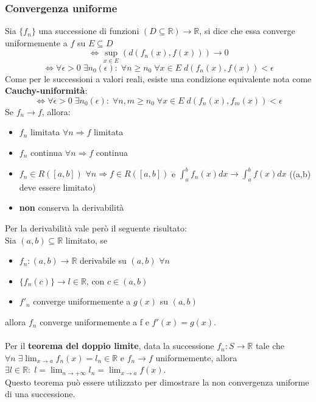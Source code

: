 \documentclass{article}
\newcommand{\R}{\mathds{R}}
\begin{document}
\subsubsection{Convergenza uniforme}
Sia $\{f_n\}$ una successione di funzioni $(D\subseteq\R)\rightarrow\R$, si dice che essa converge uniformemente a $f$ su $E\subseteq D$
$$ \Leftrightarrow \sup_{x\in E}(d(f_n(x),f(x)))\rightarrow0 $$
$$ \Leftrightarrow \forall\epsilon>0\;\exists n_0(\epsilon):\; \forall n\geq n_0\; \forall x\in E\; d(f_n(x),f(x))<\epsilon $$
Come per le successioni a valori reali, esiste una condizione equivalente nota come \textbf{Cauchy-uniformità}:
$$ \Leftrightarrow \forall\epsilon>0\;\exists n_0(\epsilon):\; \forall n,m\geq n_0\; \forall x\in E\; d(f_n(x),f_m(x))<\epsilon $$
Se $f_n\rightarrow f$, allora:
\begin{itemize}
    \item $f_n$ limitata $\forall n\Rightarrow f$ limitata
    \item $f_n$ continua $\forall n\Rightarrow f$ continua
    \item $f_n\in R([a,b])$ $\forall n\Rightarrow f\in R([a,b])$ e $\int_a^b f_n(x)dx\rightarrow\int_a^bf(x)dx$ ((a,b) deve essere limitato)
    \item \textbf{non} conserva la derivabilità 
\end{itemize}
Per la derivabilità vale però il seguente risultato:\\
Sia $(a,b)\subseteq\R$ limitato, se
\begin{itemize}
    \item $f_n:(a,b)\rightarrow\R$ derivabile su $(a,b)$ $\forall n$
    \item $\{f_n(c)\}\rightarrow l\in\R$, con $c\in(a,b)$
    \item $f'_n$ converge uniformemente a $g(x)$ su $(a,b)$
\end{itemize}
allora $f_n$ converge uniformemente a f e $f'(x)=g(x)$.\\\\
Per il \textbf{teorema del doppio limite}, data la successione $f_n:S\rightarrow\R$ tale che $\forall n\;\exists\lim_{x\rightarrow a}f_n(x)=l_n\in\R$ e $f_n\rightarrow f$ uniformemente, allora $\exists l\in\R:\; l=\lim_{n\rightarrow+\infty}l_n=\lim_{x\rightarrow a}f(x)$.\\
Questo teorema può essere utilizzato per dimostrare la non convergenza uniforme di una successione.
\end{document}
